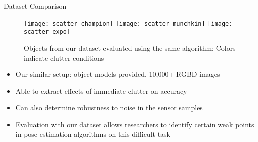 \begin{columns}[t]
\begin{column}{0.68\textwidth}
\begin{block}{\large Dataset Comparison}
\begin{itemize}
			\end{itemize}
				\begin{figure}[h]
					\texttt{[image: scatter\_champion]}
					\texttt{[image: scatter\_munchkin]}
					\texttt{[image: scatter\_expo]}
					\vspace{-0.2in}
					\caption{Objects from our dataset evaluated using the same algorithm; Colors indicate clutter conditions}
				\end{figure}
			\vspace{-0.2in}
			\begin{itemize}
				\item Our similar setup: object models provided, 10,000+ RGBD images
				\item Able to extract effects of immediate clutter on accuracy
				\item Can also determine robustness to noise in the sensor samples
				\item Evaluation with our dataset allows researchers to identify certain weak points in pose estimation algorithms on this difficult task
			\end{itemize}
		\end{block}
	\end{column}
\end{columns}